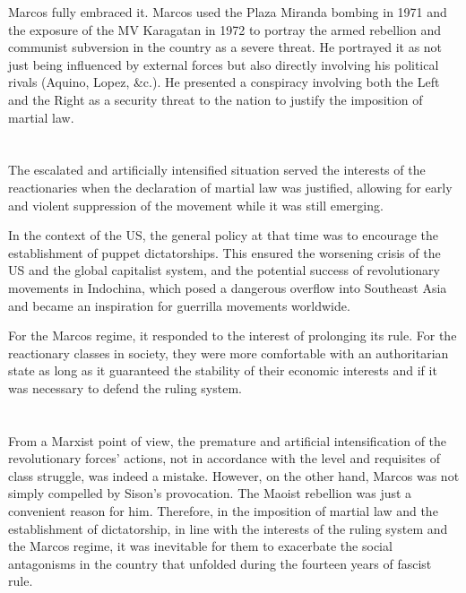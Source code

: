 Marcos fully embraced it. 
Marcos used the Plaza Miranda bombing in 1971 
and the exposure of the MV Karagatan in 1972 
to portray the armed rebellion and communist subversion in the country 
as a severe threat. 
He portrayed it as not just being influenced by external forces 
but also directly involving his political rivals (Aquino, Lopez, \&c.). 
He presented a conspiracy involving both the Left and the Right 
as a security threat to the nation to justify the imposition of martial law.


\section{}
The escalated and artificially intensified situation 
served the interests of the reactionaries 
when the declaration of martial law was justified, 
allowing for early and violent suppression of the movement 
while it was still emerging.

In the context of the US, 
the general policy at that time 
was to encourage the establishment of puppet dictatorships. 
This ensured the worsening crisis of the US and the global capitalist system, 
and the potential success of revolutionary movements in Indochina, 
which posed a dangerous overflow into Southeast Asia 
and became an inspiration for guerrilla movements worldwide.

For the Marcos regime, 
it responded to the interest of prolonging its rule. 
For the reactionary classes in society, 
they were more comfortable with an authoritarian state 
as long as it guaranteed the stability of their economic interests 
and if it was necessary to defend the ruling system.


\section{}
From a Marxist point of view, 
the premature and artificial intensification 
of the revolutionary forces' actions, 
not in accordance with the level and requisites of class struggle, 
was indeed a mistake. 
However, on the other hand, 
Marcos was not simply compelled by Sison's provocation. 
The Maoist rebellion was just a convenient reason for him. 
Therefore, 
in the imposition of martial law and the establishment of dictatorship, 
in line with the interests of the ruling system and the Marcos regime, 
it was inevitable for them to exacerbate 
the social antagonisms in the country 
that unfolded during the fourteen years of fascist rule.

